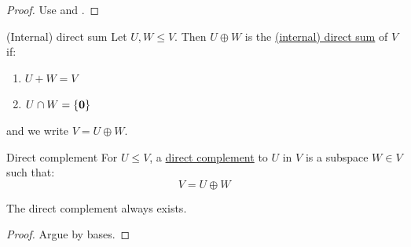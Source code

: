 \documentclass[../Main.tex]{subfiles}
\begin{document}
\begin{proof}
    Use  and .
\end{proof}
\begin{definition}{(Internal) direct sum}
    Let $U, W \leq V$. Then $U \oplus W$ is the \underline{(internal) direct sum} of $V$ if:
    \begin{enumerate}
        \item $U + W = V$
        \item $U \cap W = \{\boldsymbol{0}\}$
    \end{enumerate}
    and we write $V = U \oplus W$.
\end{definition}
\begin{definition}{Direct complement}
    For $U \leq V$, a \underline{direct complement} to $U$ in $V$ is a subspace $W \in V$ such that:
    \begin{equation*}
        V = U \oplus W
    \end{equation*}
\end{definition}
\begin{proposition}
    The direct complement always exists.
    \label{propDirCompExists}
\end{proposition}
\begin{proof}
    Argue by bases.
\end{proof}
\end{document}
